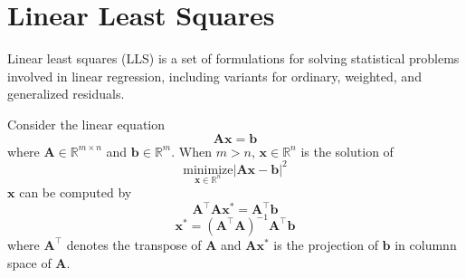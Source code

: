 

\chapter{Linear Least Squares}


Linear least squares (LLS) is a set of formulations for solving statistical problems involved in linear regression,
including variants for ordinary, weighted, and generalized residuals.

Consider the linear equation
\begin{equation}
    \mathbf{A} \mathbf{x} = \mathbf{b}
    \label{e:lls:leq}
\end{equation}
where $\mathbf{A} \in \mathbb{R}^{m \times n}$ and $\mathbf{b} \in \mathbb{R}^m$. When $m>n$,
$\mathbf{x} \in \mathbb{R}^n$ is the solution of
\begin{equation*}
    \underset{\mathbf{x} \in \mathbb{R}^n}{\text{minimize}} \left| \mathbf{A} \mathbf{x} - \mathbf{b} \right|^2
\end{equation*}
$\mathbf{x}$ can be computed by
\begin{equation*}
    \mathbf{A}^\top \mathbf{A} \mathbf{x}^* = \mathbf{A}^\top \mathbf{b}
\end{equation*}
\begin{equation}
    \mathbf{x}^* = (\mathbf{A}^\top \mathbf{A})^{-1} \mathbf{A}^\top \mathbf{b}
    \label{e:lls:sol}
\end{equation}
where $\mathbf{A}^\top$ denotes the transpose of $\mathbf{A}$ and $\mathbf{A} \mathbf{x}^*$ is the projection of
$\mathbf{b}$ in columnn space of $\mathbf{A}$.
